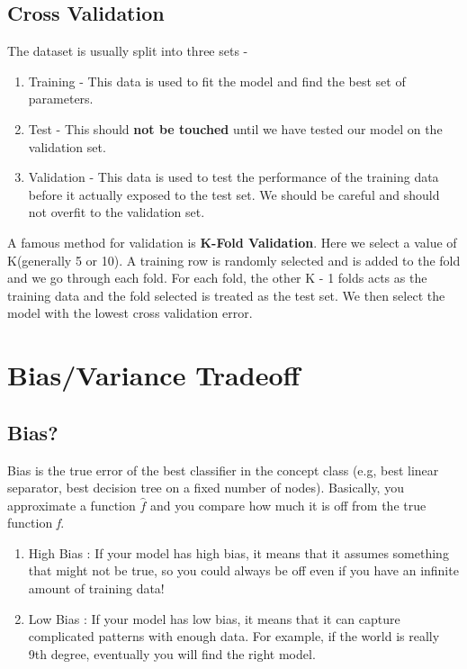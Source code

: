 \subsection {Cross Validation}
The dataset is usually split into three sets - 
\begin{enumerate}
\item Training - This data is used to fit the model and find the best set of parameters. 
\item Test - This should \textbf{not be touched} until we have tested our model on the validation set. 
\item Validation - This data is used to test the performance of the training data before it actually exposed to the test set. We should be careful and should not overfit to the validation set. 
\end{enumerate}
A famous method for validation is \textbf{K-Fold Validation}. Here we select a value of K(generally 5 or 10). A training row is randomly selected and is added to the fold and we go through each fold. 
For each fold, the other K - 1 folds acts as the training data and  the fold selected is treated as the test set. We then select the model with the lowest cross validation error. 

\section{Bias/Variance Tradeoff}

\subsection {Bias?}
Bias is the true error of the best classifier in the concept class (e.g, best linear separator, best decision tree on a fixed number of nodes). Basically, you approximate a function $\hat{f}$ and you compare how much it is off from the true 
function \emph{f}.
\begin{enumerate}
\item High Bias :  If your model has high bias, it means that it assumes something that might not be true, so you could always be off even if you have an infinite amount of training data! 
\item Low Bias : If your model has low bias, it means that it can capture complicated patterns with enough data. For example, if the world is really 9th degree, eventually you will find the right model. 
\end{enumerate}


